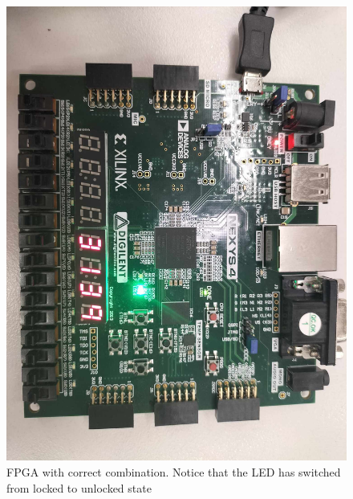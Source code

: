 \documentclass[12pt,a4paper]{article}
\begin{document}
\begin{figure}[H]
    \centering
    \includegraphics[scale=0.25]{images/fpga_2.jpg}
    \caption{FPGA with correct combination. Notice that the LED has switched from locked to unlocked state}
    \label{fig:fpga_2}
\end{figure}
\end{document}
